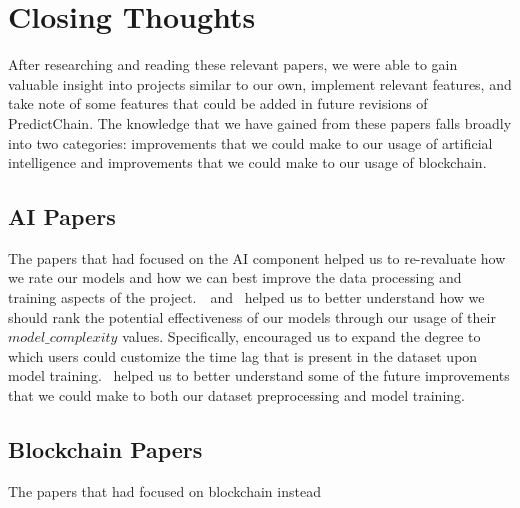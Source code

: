 \documentclass{article}
\begin{document}
    \section{Closing Thoughts}

    After researching and reading these relevant papers, we were able to gain valuable insight into projects similar to
    our own, implement relevant features, and take note of some features that could be added in future revisions of
    PredictChain.  The knowledge that we have gained from these papers falls broadly into two categories: improvements
    that we could make to our usage of artificial intelligence and improvements that we could make to our usage of
    blockchain.

    \subsection{AI Papers}
    The papers that had focused on the AI component helped us to re-revaluate how we rate our models and how we can best
    improve the data processing and training aspects of the project.~\cite{LSTM}~and~\cite{recurrentModeling} helped
    us to better understand how we should rank the potential effectiveness of our models through our usage of
    their $model\_complexity$ values.  Specifically, \cite{LSTM} encouraged us to expand the degree to
    which users could customize the time lag that is present in the dataset upon model training.~\cite{deepPrediction}
    helped us to better understand some of the future improvements that we could make to both our dataset preprocessing
    and model training.

    \subsection{Blockchain Papers}
    The papers that had focused on blockchain instead

    \pagebreak
    
    
\end{document}

